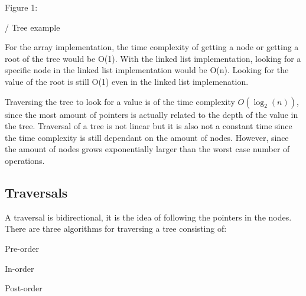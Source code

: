 \documentclass[11pt,a4paper,english]{paper}
\begin{document}
\bigskip

\begin{bbox}{Figure 1:}


    / Tree example

  \end{bbox}

  \bigskip

\noindent For the array implementation, the time complexity of getting a node or getting a root of the tree would be O(1). With the linked list implementation, looking for a specific node in the linked list implementation would be O(n). Looking for the value of the root is still O(1) even in the linked list implemenation.


\bigskip
\noindent Traversing the tree to look for a value is of the time complexity $O(\log_{2}(n))$, since the most amount of pointers is actually related to the depth of the value in the tree. Traversal of a tree is not linear but it is also not a constant time since the time complexity is still dependant on the amount of nodes. However, since the amount of nodes grows exponentially larger than the worst case number of operations. 

\subsection{Traversals}

A traversal is bidirectional, it is the idea of following the pointers in the nodes. There are three algorithms for traversing a tree consisting of:
\begin{itemize} {

  \item Pre-order
  \item In-order
  \item Post-order

}\end{itemize}
\end{document}
